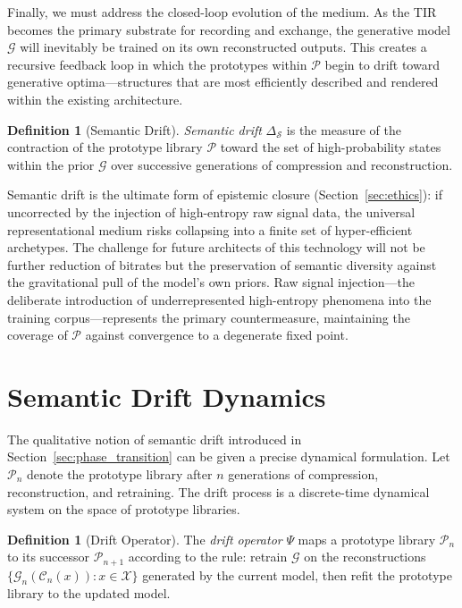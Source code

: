 \documentclass[11pt,a4paper]{article}
\theoremstyle{definition}
\newtheorem{definition}[theorem]{Definition}
\theoremstyle{remark}
\begin{document}
Finally, we must address the closed-loop evolution of the medium. As the TIR becomes the primary substrate for recording and exchange, the generative model $\mathcal{G}$ will inevitably be trained on its own reconstructed outputs. This creates a recursive feedback loop in which the prototypes within $\mathcal{P}$ begin to drift toward generative optima---structures that are most efficiently described and rendered within the existing architecture.

\begin{definition}[Semantic Drift]
\emph{Semantic drift} $\Delta_{\mathcal{S}}$ is the measure of the contraction of the prototype library $\mathcal{P}$ toward the set of high-probability states within the prior $\mathcal{G}$ over successive generations of compression and reconstruction.
\end{definition}

Semantic drift is the ultimate form of epistemic closure (Section~\ref{sec:ethics}): if uncorrected by the injection of high-entropy raw signal data, the universal representational medium risks collapsing into a finite set of hyper-efficient archetypes. The challenge for future architects of this technology will not be further reduction of bitrates but the preservation of semantic diversity against the gravitational pull of the model's own priors. Raw signal injection---the deliberate introduction of underrepresented high-entropy phenomena into the training corpus---represents the primary countermeasure, maintaining the coverage of $\mathcal{P}$ against convergence to a degenerate fixed point.

\section{Semantic Drift Dynamics}
\label{sec:drift_dynamics}

The qualitative notion of semantic drift introduced in Section~\ref{sec:phase_transition} can be given a precise dynamical formulation. Let $\mathcal{P}_n$ denote the prototype library after $n$ generations of compression, reconstruction, and retraining. The drift process is a discrete-time dynamical system on the space of prototype libraries.

\begin{definition}[Drift Operator]
The \emph{drift operator} $\Psi$ maps a prototype library $\mathcal{P}_n$ to its successor $\mathcal{P}_{n+1}$ according to the rule: retrain $\mathcal{G}$ on the reconstructions $\{\mathcal{G}_n(\mathcal{C}_n(x)) : x \in \mathcal{X}\}$ generated by the current model, then refit the prototype library to the updated model.
\end{definition}
\end{document}
